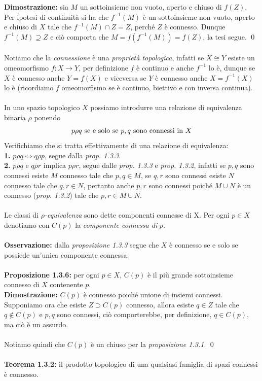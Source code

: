 \documentclass{article}
\begin{document}
\textbf{Dimostrazione:} sia $M$ un sottoinsieme non vuoto, aperto e chiuso di $f(Z)$. Per ipotesi di continuità si ha che $f^{-1}(M)$ è un sottoinsieme non vuoto, aperto e chiuso di $X$ tale che $f^{-1}(M) \cap Z = Z$, perché $Z$ è connesso. Dunque $f^{-1}(M) \supseteq Z$ e ciò comporta che $M = f(f^{-1}(M)) = f(Z)$, la tesi segue. \qed \\ \\
Notiamo che la \textit{connessione} è una \textit{proprietà topologica}, infatti se $X \cong Y$ esiste un omeomorfismo $f : X \longrightarrow Y$, per definizione $f$ è continuo e anche $f^{-1}$ lo è, dunque se $X$ è connesso anche $Y = f(X)$ e viceversa se $Y$ è connesso anche $X = f^{-1}(X)$ lo è (ricordiamo $f$ omeomorfismo se è continuo, biettivo e con inversa continua). \\ \\
In uno spazio topologico $X$ possiamo introdurre una relazione di equivalenza binaria $\rho$ ponendo
\begin{gather}
    p \rho q \text{ se e solo se } p,q \text{ sono connessi in } X \notag
\end{gather}
Verifichiamo che si tratta effettivamente di una relazione di equivalenza: \\
\textbf{1.} $p \rho q \iff q \rho p$, segue dalla \textit{prop. 1.3.3}. \\
\textbf{2.} $p \rho q$ e $q \rho r$ implica $p \rho r$, segue dalle \textit{prop. 1.3.3} e \textit{prop. 1.3.2}, infatti se $p, q$ sono connessi esiste $M$ connesso tale che $p, q \in M$, se $q, r$ sono connessi esiste $N$ connesso tale che $q, r \in N$, pertanto anche $p, r$ sono connessi poiché $M \cup N$ è un connesso (\textit{prop. 1.3.2}) tale che $p, r \in M \cup N$. \\ \\
Le classi di $\rho$\textit{-equivalenza} sono dette componenti connesse di X. Per ogni $p \in X$ denotiamo con $C(p)$ la \textit{componente connessa di} $p$. \\ \\
\textbf{Osservazione:} dalla \textit{proposizione 1.3.3} segue che $X$ è connesso se e solo se possiede un'unica componente connessa. \\ \\
\textbf{Proposizione 1.3.6:} per ogni $p \in X$, $C(p)$ è il più grande sottoinsieme connesso di $X$ contenente $p$. \\

\textbf{Dimostrazione:} $C(p)$ è connesso poiché unione di insiemi connessi. Supponiamo ora che esiste $Z \supset C(p)$ connesso, allora esiste $q \in Z$ tale che $q \not\in C(p)$ e $p, q$ sono connessi, ciò comporterebbe, per definizione, $q \in C(p)$, ma ciò è un assurdo. \\ \\ Notiamo quindi che $C(p)$ è un chiuso per la \textit{proposizione 1.3.1}. \qed \\ \\
\textbf{Teorema 1.3.2:} il prodotto topologico di una qualsiasi famiglia di spazi connessi è connesso. \\
\end{document}
